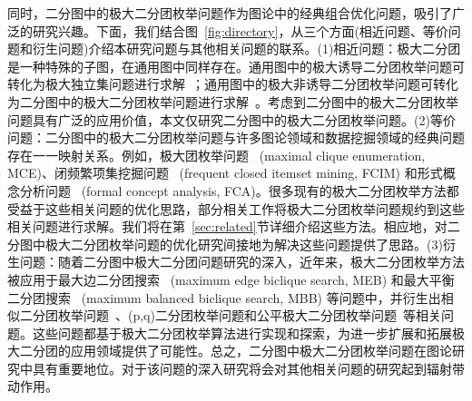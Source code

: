 同时，二分图中的极大二分团枚举问题作为图论中的经典组合优化问题，吸引了广泛的研究兴趣。下面，我们结合图~\ref{fig:directory}，从三个方面(相近问题、等价问题和衍生问题)介绍本研究问题与其他相关问题的联系。(1)相近问题：极大二分团是一种特殊的子图，在通用图中同样存在。通用图中的极大诱导二分团枚举问题可转化为极大独立集问题进行求解~\cite{MBE-induced21}；通用图中的极大非诱导二分团枚举问题可转化为二分图中的极大二分团枚举问题进行求解~\cite{Proof09}。考虑到二分图中的极大二分团枚举问题具有广泛的应用价值，本文仅研究二分图中的极大二分团枚举问题。(2)等价问题：二分图中的极大二分团枚举问题与许多图论领域和数据挖掘领域的经典问题存在一一映射关系。例如，极大团枚举问题~\cite{MCE20,MCE-GPU21,MCE22} (maximal clique enumeration, MCE)、闭频繁项集挖掘问题~\cite{FCIM98,FCIM22} (frequent closed itemset mining, FCIM) 和形式概念分析问题~\cite{FCA21,FCA22} (formal concept analysis, FCA)。很多现有的极大二分团枚举方法都受益于这些相关问题的优化思路，部分相关工作将极大二分团枚举问题规约到这些相关问题进行求解。我们将在第~\ref{sec:related}节详细介绍这些方法。相应地，对二分图中极大二分团枚举问题的优化研究间接地为解决这些问题提供了思路。(3)衍生问题：随着二分图中极大二分团问题研究的深入，近年来，极大二分团枚举方法被应用于最大边二分团搜索~\cite{MEB20,MEB22} (maximum edge biclique search, MEB) 和最大平衡二分团搜索~\cite{MBB21} (maximum balanced biclique search, MBB) 等问题中，并衍生出相似二分团枚举问题~\cite{SimilarMBE22}、(p,q)二分团枚举问题\cite{PQ21}和公平极大二分团枚举问题~\cite{FairMBE23}等相关问题。这些问题都基于极大二分团枚举算法进行实现和探索，为进一步扩展和拓展极大二分团的应用领域提供了可能性。总之，二分图中极大二分团枚举问题在图论研究中具有重要地位。对于该问题的深入研究将会对其他相关问题的研究起到辐射带动作用。



